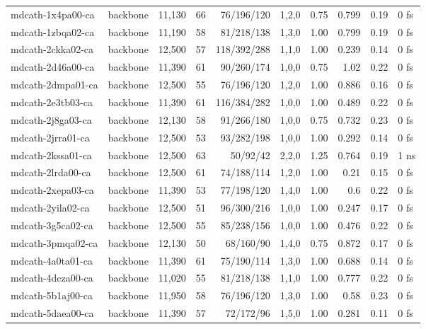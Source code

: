 \begin{small}
\begin{longtable}{llrrrlrrrl}
mdcath-1x4pa00-ca & backbone & 11,130 & 66 & 76/196/120 & 1,2,0 & 0.75 & 0.799 & 0.19 & 0 fs\\
mdcath-1zbqa02-ca & backbone & 11,190 & 58 & 81/218/138 & 1,3,0 & 1.00 & 0.799 & 0.19 & 0 fs\\
mdcath-2ckka02-ca & backbone & 12,500 & 57 & 118/392/288 & 1,1,0 & 1.00 & 0.239 & 0.14 & 0 fs\\
mdcath-2d46a00-ca & backbone & 11,390 & 61 & 90/260/174 & 1,0,0 & 0.75 & 1.02 & 0.22 & 0 fs\\
mdcath-2dmpa01-ca & backbone & 12,500 & 55 & 76/196/120 & 1,2,0 & 1.00 & 0.886 & 0.16 & 0 fs\\
mdcath-2e3tb03-ca & backbone & 11,390 & 61 & 116/384/282 & 1,0,0 & 1.00 & 0.489 & 0.22 & 0 fs\\
mdcath-2j8ga03-ca & backbone & 12,130 & 58 & 91/266/180 & 1,0,0 & 0.75 & 0.732 & 0.23 & 0 fs\\
mdcath-2jrra01-ca & backbone & 12,500 & 53 & 93/282/198 & 1,0,0 & 1.00 & 0.292 & 0.14 & 0 fs\\
mdcath-2kssa01-ca & backbone & 12,500 & 63 & 50/92/42 & 2,2,0 & 1.25 & 0.764 & 0.19 & 1 ns\\
mdcath-2lrda00-ca & backbone & 12,500 & 61 & 74/188/114 & 1,2,0 & 1.00 & 0.21 & 0.15 & 0 fs\\
mdcath-2xepa03-ca & backbone & 11,390 & 53 & 77/198/120 & 1,4,0 & 1.00 & 0.6 & 0.22 & 0 fs\\
mdcath-2yila02-ca & backbone & 12,500 & 51 & 96/300/216 & 1,0,0 & 1.00 & 0.247 & 0.17 & 0 fs\\
mdcath-3g5ca02-ca & backbone & 12,500 & 55 & 85/238/156 & 1,0,0 & 1.00 & 0.476 & 0.22 & 0 fs\\
mdcath-3pmqa02-ca & backbone & 12,130 & 50 & 68/160/90 & 1,4,0 & 0.75 & 0.872 & 0.17 & 0 fs\\
mdcath-4a0ta01-ca & backbone & 11,390 & 61 & 75/190/114 & 1,3,0 & 1.00 & 0.688 & 0.14 & 0 fs\\
mdcath-4dcza00-ca & backbone & 11,020 & 55 & 81/218/138 & 1,1,0 & 1.00 & 0.777 & 0.22 & 0 fs\\
mdcath-5b1aj00-ca & backbone & 11,950 & 58 & 76/196/120 & 1,3,0 & 1.00 & 0.58 & 0.23 & 0 fs\\
mdcath-5daea00-ca & backbone & 11,390 & 57 & 72/172/96 & 1,5,0 & 1.00 & 0.281 & 0.11 & 0 fs\\
\bottomrule\end{longtable}\end{small}
